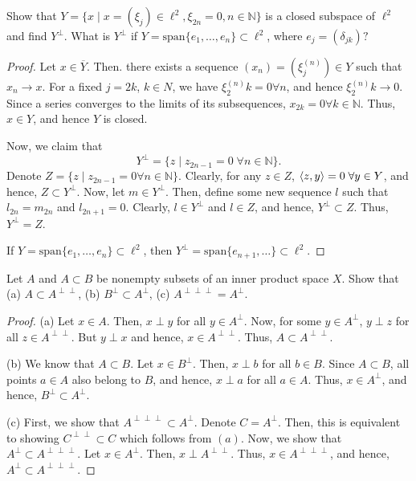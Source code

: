 \begin{question}
    Show that $Y = \{x \mid x = (\xi_j) \in \ell^2 , \xi_{2n} = 0 , n \in \mathbb{N}\}$ is a closed subspace of $\ell^2$ and find $Y^\perp$. What is $Y^\perp$ if $Y = \textrm{span}\{e_1 , \ldots , e_n\} \subset \ell^2$, where $e_j = (\delta_{jk})?$
    \label{section3.3-6}
\end{question}
\begin{proof}
    Let $x \in \overline{Y}$. Then. there exists a sequence $(x_n) = (\xi^{(n)}_j) \in Y$ such that $x_n \rightarrow x$. For a fixed $j = 2k$, $k \in N$, we have $\xi^{(n)}_2k = 0 \forall n$, and hence $\xi^{(n)}_2k \rightarrow 0$. Since a series converges to the limits of its subsequences, $x_{2k} = 0 \forall k \in \mathbb{N}$. Thus, $x \in Y$, and hence $Y$ is closed. 

    Now, we claim that 
    \[Y^\perp = \{z \mid z_{2n-1} = 0 \;\forall n \in \mathbb{N}\}.\]
    Denote $Z =  \{z \mid z_{2n-1} = 0 \forall n \in \mathbb{N}\}$. Clearly, for any $z \in Z$, $\left\langle z , y \right\rangle = 0 \;\forall y \in Y$, and hence, $Z \subset Y^\perp$. Now, let $m \in Y^\perp$. Then, define some new sequence $l$ such that $l_{2n} = m_{2n}$ and $l_{2n+1} = 0$. Clearly, $l \in Y^\perp$ and $l \in Z$, and hence, $Y^\perp \subset Z$. Thus, $Y^\perp = Z$.

    If $Y = \textrm{span}\{e_1 , \ldots , e_n\} \subset \ell^2$, then $Y^\perp = \textrm{span}\{e_{n+1} , \ldots\} \subset \ell^2$.
\end{proof}

\begin{question}
    Let $A$ and $A \subset B$ be nonempty subsets of an inner product space $X$. Show that (a) $A \subset A^{\perp\perp}$, (b) $B^\perp \subset A^\perp$, (c) $A^{\perp\perp\perp} = A^\perp$.
    \label{section3.3-7}
\end{question}
\begin{proof}
    (a) Let $x \in A$. Then, $x \perp y$ for all $y \in A^\perp.$ Now, for some $y \in A^\perp$, $y \perp z$ for all $z \in A^{\perp\perp}$. But $y \perp x$ and hence, $x \in A^{\perp\perp}$. Thus, $A \subset A^{\perp\perp}$.

    (b) We know that $A \subset B$. Let $x \in B^\perp$. Then, $x \perp b$ for all $b \in B$. Since $A \subset B$, all points $a \in A$ also belong to $B$, and hence, $x \perp a$ for all $a \in A$. Thus, $x \in A^\perp$, and hence, $B^\perp \subset A^\perp.$

    (c) First, we show that $A^{\perp\perp\perp} \subset A^\perp$. Denote $C = A^\perp$. Then, this is equivalent to showing $C^{\perp\perp} \subset C$ which follows from $(a)$. Now, we show that $A^\perp \subset A^{\perp\perp\perp}.$ Let $x \in A^\perp$. Then, $x \perp A^{\perp\perp}$. Thus, $x \in A^{\perp\perp\perp}$, and hence, $A^\perp \subset A^{\perp\perp\perp}$.

\end{proof}


